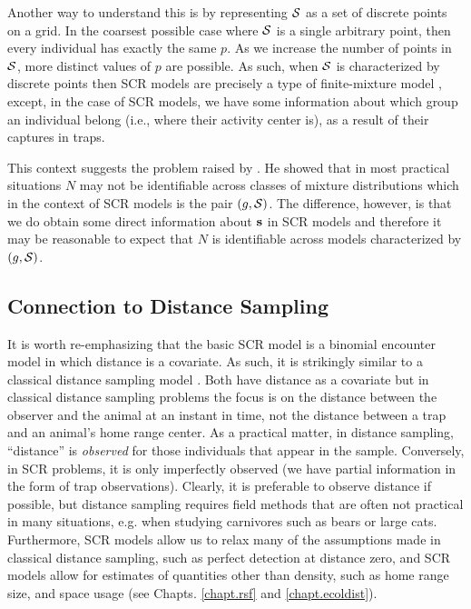 Another way to understand this is by representing ${\cal S}$ as a set
of discrete points on a grid. In the coarsest possible case where
${\cal S}$ is a single arbitrary point, then every individual has
exactly the same $p$. As we increase the number of points in ${\cal
  S}$,  more distinct values of $p$ are possible. As such, when
${\cal S}$ is characterized by discrete points then SCR models are
precisely a type of finite-mixture model \citep{norris_pollock:1996,
  pledger:2000}, except, in the case of SCR models, we have some information about which
group an individual belong (i.e., where their activity center is), as
a result of their captures in traps.

This context suggests the problem raised by \citet{link:2003}. He
showed that in most practical situations $N$ may not be identifiable
across classes of mixture distributions which in the context of SCR
models is the pair $(g, {\cal S})$.  The difference, however, is that
we do obtain some direct information about ${\bf s}$ in SCR models and
therefore it may be reasonable to expect that
$N$ is identifiable across models characterized by $(g,{\cal
  S})$.

\subsection{Connection to Distance Sampling}

It is worth re-emphasizing that the basic SCR model is a binomial
encounter model in which distance is a covariate. As such, it is
strikingly similar to a classical distance sampling model \citep{buckland_etal:2002}. Both have
distance as a covariate but in classical distance sampling problems
the focus is on the distance between the observer and the animal at an
instant in time, not the distance between a trap and an animal's home
range center. As a practical matter, in distance sampling, ``distance'' is {\it
  observed} for those individuals that appear in the
sample. Conversely, in SCR problems, it is only imperfectly observed
(we have partial information in the form of trap observations).
Clearly, it is preferable to observe distance if possible, but 
distance sampling requires field methods that
are often not practical in many situations, e.g. when studying
carnivores such as bears or large cats. Furthermore, SCR models allow us to relax many of the
assumptions made in classical distance sampling, such as perfect detection at distance zero, and SCR models allow
for estimates of quantities other than density, such as home range
size, and space usage (see Chapts. \ref{chapt.rsf} and \ref{chapt.ecoldist}).


